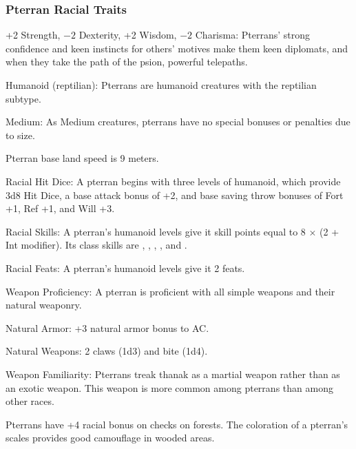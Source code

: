 \subsubsection{Pterran Racial Traits}
\begin{itemize*}
    \item +2 Strength, $-2$ Dexterity, +2 Wisdom, $-2$ Charisma: Pterrans' strong confidence and keen instincts for others' motives make them keen diplomats, and when they take the path of the psion, powerful telepaths.
    \item Humanoid (reptilian): Pterrans are humanoid creatures with the reptilian subtype.
    \item Medium: As Medium creatures, pterrans have no special bonuses or penalties due to size.
    \item Pterran base land speed is 9 meters.

    \item Racial Hit Dice: A pterran begins with three levels of humanoid, which provide 3d8 Hit Dice, a base attack bonus of +2, and base saving throw bonuses of Fort +1, Ref +1, and Will +3.
    \item Racial Skills: A pterran's humanoid levels give it skill points equal to 8 $\times$ (2 + Int modifier). Its class skills are , , , , and .
    \item Racial Feats: A pterran's humanoid levels give it 2 feats.
    \item Weapon Proficiency: A pterran is proficient with all simple weapons and their natural weaponry.

    \item Natural Armor: +3 natural armor bonus to AC.
    \item Natural Weapons: 2 claws (1d3) and bite (1d4).
    \item Weapon Familiarity: Pterrans treak thanak as a martial weapon rather than as an exotic weapon. This weapon is more common among pterrans than among other races.

    \item Pterrans have +4 racial bonus on  checks on forests. The coloration of a pterran's scales provides good camouflage in wooded areas.


\end{itemize*}
